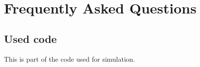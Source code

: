 
\chapter{Frequently Asked Questions} %

\label{AppendixA} %

\section{Used code}

This is part of the code used for simulation.

\inputminted[linenos, breaklines]{python}{Appendices/ADM_cart_2.py}

%
%
%
%
%
%
%
%
